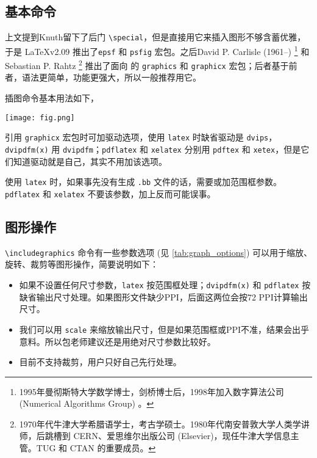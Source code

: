 \subsection{基本命令}

上文提到Knuth留下了后门 \verb|\special|，但是直接用它来插入图形不够含蓄优雅，于是 \LaTeX v2.09 推出了\texttt{epsf} 和 \texttt{psfig} 宏包。之后David P. Carlisle (1961--)\indexCarlisle{} \footnote{1995年曼彻斯特大学数学博士，剑桥博士后，1998年加入数字算法公司 (Numerical Algorithms Group) 。} 和Sebastian P. Rahtz\indexRahtz{} \footnote{1970年代牛津大学希腊语学士，考古学硕士。1980年代南安普敦大学人类学讲师，后跳槽到 CERN、爱思维尔出版公司 (Elsevier)\indexElsevier ，现任牛津大学信息主管。TUG 和 CTAN 的重要成员。} 推出了面向 \LaTeXe 的 \texttt{graphics} 和 \texttt{graphicx} 宏包；后者基于前者，语法更简单，功能更强大，所以一般推荐用它。

插图命令基本用法如下，

\begin{Code}[]
\usepackage[dvipdfm]{graphicx}
\texttt{[image: fig.png]}
\end{Code}

引用 \texttt{graphicx} 宏包时可加驱动选项，使用 \texttt{latex} 时缺省驱动是 \texttt{dvips}，\texttt{dvipdfm(x)} 用 \texttt{dvipdfm}；\texttt{pdflatex} 和 \texttt{xelatex} 分别用 \texttt{pdftex} 和 \texttt{xetex}，但是它们知道驱动就是自己，其实不用加该选项。

使用 \texttt{latex} 时，如果事先没有生成 \texttt{.bb} 文件的话，需要或加范围框参数。\texttt{pdflatex} 和 \texttt{xelatex} 不要该参数，加上反而可能误事。

\subsection{图形操作}

\verb|\includegraphics| 命令有一些参数选项 (见 \autoref{tab:graph_options}) 可以用于缩放、旋转、裁剪等图形操作，简要说明如下：

\begin{itemize}
\item 如果不设置任何尺寸参数，\texttt{latex} 按范围框处理；\texttt{dvipdfm(x)} 和 \texttt{pdflatex} 按缺省输出尺寸处理。如果图形文件缺少PPI，后面这两位会按72 PPI计算输出尺寸。
\item 我们可以用 \texttt{scale} 来缩放输出尺寸，但是如果范围框或PPI不准，结果会出乎意料。所以包老师建议还是用绝对尺寸参数比较好。
\item \XeTeX 目前不支持裁剪，用户只好自己先行处理。
\end{itemize}

